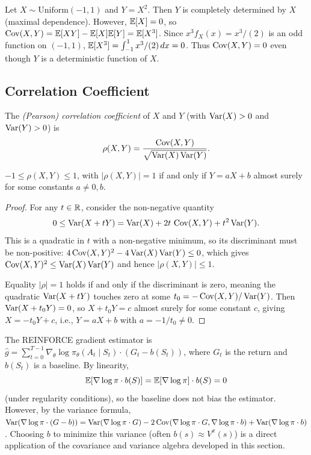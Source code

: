 \documentclass[11pt,a4paper]{article}
\begin{document}
\begin{example}
\label{ex:uncorrelated_dependent}
Let $X \sim \mathrm{Uniform}(-1, 1)$ and $Y = X^2$. Then $Y$ is
completely determined by $X$ (maximal dependence). However,
$\mathbb{E}[X] = 0$, so $\operatorname{Cov}(X, Y) = \mathbb{E}[XY] - \mathbb{E}[X]\mathbb{E}[Y] = \mathbb{E}[X^3]$.
Since $x^3 f_X(x) = x^3/(2)$ is an odd function on $(-1, 1)$,
$\mathbb{E}[X^3] = \int_{-1}^{1} x^3/(2)\,dx = 0$.
Thus $\operatorname{Cov}(X, Y) = 0$ even though $Y$ is a deterministic function of $X$.
\end{example}

\subsection{Correlation Coefficient}

\begin{definition}
\label{def:correlation}
The \emph{(Pearson) correlation coefficient} of $X$ and $Y$ (with
$\operatorname{Var}(X) > 0$ and $\operatorname{Var}(Y) > 0$) is
\[
    \rho(X, Y) = \frac{\operatorname{Cov}(X, Y)}{\sqrt{\operatorname{Var}(X) \operatorname{Var}(Y)}}.
\]
\end{definition}

\begin{proposition}
\label{prop:correlation_bounds}
$-1 \leq \rho(X, Y) \leq 1$, with $|\rho(X,Y)| = 1$ if and only if
$Y = aX + b$ almost surely for some constants $a \neq 0, b$.
\end{proposition}

\begin{proof}
For any $t \in \mathbb{R}$, consider the non-negative quantity
\[
    0 \leq \operatorname{Var}(X + tY)
    = \operatorname{Var}(X) + 2t\,\operatorname{Cov}(X,Y) + t^2 \operatorname{Var}(Y).
\]
This is a quadratic in $t$ with a non-negative minimum, so its
discriminant must be non-positive:
$4\operatorname{Cov}(X,Y)^2 - 4\operatorname{Var}(X)\operatorname{Var}(Y) \leq 0$,
which gives $\operatorname{Cov}(X,Y)^2 \leq \operatorname{Var}(X)\operatorname{Var}(Y)$ and hence
$|\rho(X,Y)| \leq 1$.

Equality $|\rho| = 1$ holds if and only if the discriminant is zero,
meaning the quadratic $\operatorname{Var}(X + tY)$ touches zero at some
$t_0 = -\operatorname{Cov}(X,Y)/\operatorname{Var}(Y)$. Then
$\operatorname{Var}(X + t_0 Y) = 0$, so $X + t_0 Y = c$ almost surely for some
constant $c$, giving $X = -t_0 Y + c$, i.e., $Y = aX + b$ with
$a = -1/t_0 \neq 0$.
\end{proof}

\begin{rlconnection}[title={Variance Reduction in REINFORCE}]
The REINFORCE gradient estimator is
$\hat{g} = \sum_{t=0}^{T-1} \nabla_\theta \log\pi_\theta(A_t \mid S_t)
\cdot (G_t - b(S_t))$,
where $G_t$ is the return and $b(S_t)$ is a baseline. By linearity,
\[
    \mathbb{E}[\nabla\log\pi \cdot b(S)] = \mathbb{E}[\nabla\log\pi] \cdot b(S) = 0
\]
(under regularity conditions), so the baseline does not bias the
estimator. However, by the variance formula,
$\operatorname{Var}(\nabla\log\pi \cdot (G - b))
= \operatorname{Var}(\nabla\log\pi \cdot G) - 2\operatorname{Cov}(\nabla\log\pi \cdot G,
\nabla\log\pi \cdot b) + \operatorname{Var}(\nabla\log\pi \cdot b)$.
Choosing $b$ to minimize this variance (often $b(s) \approx V^\pi(s)$)
is a direct application of the covariance and variance algebra developed
in this section.
\end{rlconnection}
\end{document}
